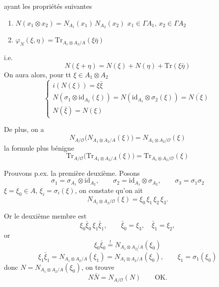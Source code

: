 \documentclass[11pt,a4paper]{article}
\begin{document}
ayant les propriétés suivantes
\begin{enumerate}
  \item[a)] $N(x_1 \otimes x_2) = N_{A_1}(x_1)\, N_{A_2}(x_2)$ \qquad $x_1 \in \Gamma A_1$, $x_2 \in \Gamma A_2$
  \item[b)] $\varphi_N(\xi, \eta) = \mathrm{Tr}_{A_1 \otimes A_2 / A}(\xi \bar{\eta})$
\end{enumerate}
 i.e.
\[
  N(\xi + \eta) = N(\xi) + N(\eta) + \mathrm{Tr}(\xi \bar{\eta})
\]
On aura alors, pour tt $\xi \in A_1 \otimes A_2$
\[
  \begin{cases}
    i(N(\xi)) = \xi \bar{\xi} \\
    N(\sigma_1 \otimes \mathrm{id}_{A_2}(\xi)) = N(\mathrm{id}_{A_1} \otimes \sigma_2(\xi)) = \overline{N(\xi)} \\
    N(\bar{\xi}) = N(\xi)
  \end{cases}
\]

De plus, on a
\[
  N_{A/\mathcal{O}}\bigl(N_{A_1 \otimes A_2 / A}(\xi)\bigr) = N_{A_1 \otimes A_2 / \mathcal{O}}(\xi)
\]
 la formule plus bénigne
\[
  \mathrm{Tr}_{A/\mathcal{O}}\bigl(\mathrm{Tr}_{A_1 \otimes A_2 / A}(\xi)\bigr) = \mathrm{Tr}_{A_1 \otimes A_2 / \mathcal{O}}(\xi)
\]

Prouvons p.ex. la première   deuxième. \ill{} Posons
\[
  \sigma_1 = \sigma_{A_1} \otimes \mathrm{id}_{A_2} , \qquad
  \sigma_2 = \mathrm{id}_{A_1} \otimes \sigma_{A_2} , \qquad
  \sigma_3 = \sigma_1 \sigma_2
\]
  $\xi = \xi_0 \in A$,  $\xi_i = \sigma_i(\xi)$, on constate qu'on ait
\[
  N_{A_1 \otimes A_2 / \mathcal{O}}(\xi) = \xi_0\, \xi_1\, \xi_2\, \xi_3 .
\]

Or le deuxième membre est
\[
  \xi_0 \bar{\xi}_0\, \xi_1 \bar{\xi}_1 , \qquad \bar{\xi}_0 = \xi_3 , \quad \bar{\xi}_1 = \xi_2 ,
\]
or
\[
  \xi_0 \bar{\xi}_0 \overset{!}{=} N_{A_1 \otimes A_2 / A}(\xi_0)
\]
\[
  \xi_1 \bar{\xi}_1 = N_{A_1 \otimes A_2 / A}(\xi_1) = \overline{N_{A_1 \otimes A_2 / A}(\xi_0)} ,
  \qquad \xi_1 = \sigma_1(\xi_0)
\]
donc \struck{\ill{}}  $N = N_{A_1 \otimes A_2 / A}(\xi_0)$, on trouve
\[
  N \bar{N} = N_{A/\mathcal{O}}(N) \qquad \text{OK.}
\]
\end{document}
